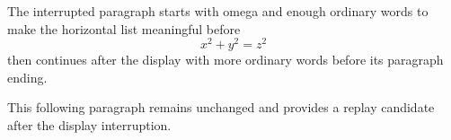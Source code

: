 
\hsize=220pt \vsize=240pt
The interrupted paragraph starts with omega and enough ordinary words to make the horizontal list meaningful before
$$x^2+y^2=z^2$$
then continues after the display with more ordinary words before its paragraph ending.

This following paragraph remains unchanged and provides a replay candidate after the display interruption.
\bye
